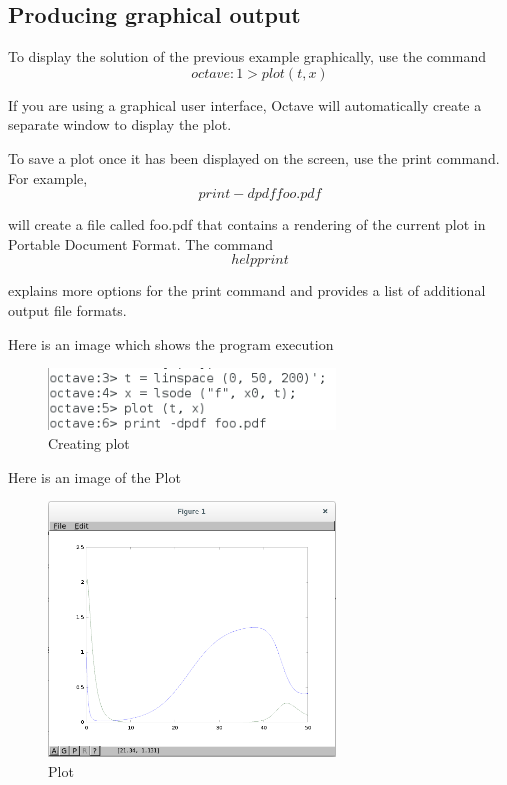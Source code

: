 \documentclass[a4paper,12pt]{article}
\begin{document}
\subsection{Producing graphical output}
\justifying
\par
To display the solution of the previous example graphically, use the command
\begin{equation}
    \label{simple_equation}
	octave:1> plot (t, x)
\end{equation}
\par
If you are using a graphical user interface, Octave will automatically create a separate window to display the plot.
\par
To save a plot once it has been displayed on the screen, use the print command. For example,
\begin{equation}
    \label{simple_equation}
	print -dpdf foo.pdf
\end{equation}
\par
will create a file called foo.pdf that contains a rendering of the current plot in Portable Document Format. The command
\begin{equation}
    \label{simple_equation}
	help print
\end{equation}
\par
explains more options for the print command and provides a list of additional output file formats.
\par
Here is an image which shows the program execution
\begin{figure}[H]
    \centering
    \includegraphics[width=3.0in]{img/6.png}
    \caption{Creating plot}
    \label{simulationfigure}
\end{figure}
\par
Here is an image of the Plot
\begin{figure}[H]
    \centering
    \includegraphics[width=3.0in]{img/7.png}
    \caption{Plot}
    \label{simulationfigure}
\end{figure}
\end{document}
